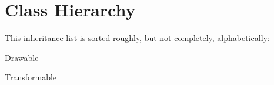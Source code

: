 \section{Class Hierarchy}
This inheritance list is sorted roughly, but not completely, alphabetically\+:\begin{DoxyCompactList}
\item {}
\item Drawable\begin{DoxyCompactList}
\item {}
\end{DoxyCompactList}
\item Transformable\begin{DoxyCompactList}
\item {}
\end{DoxyCompactList}
\end{DoxyCompactList}
